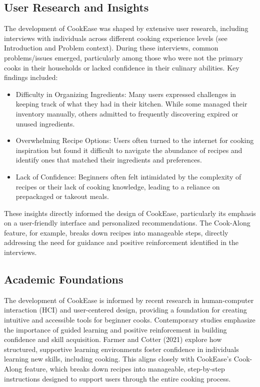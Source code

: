 \documentclass[10pt,twocolumn]{article}
\begin{document}
\subsection{User Research and Insights}
The development of CookEase was shaped by extensive user research, including interviews with individuals across different cooking experience levels (see Introduction and Problem context). During these interviews, common problems/issues emerged, particularly among those who were not the primary cooks in their households or lacked confidence in their culinary abilities. Key findings included:
\begin{itemize}
    \item Difficulty in Organizing Ingredients: Many users expressed challenges in keeping track of what they had in their kitchen. While some managed their inventory manually, others admitted to frequently discovering expired or unused ingredients.
    \item Overwhelming Recipe Options: Users often turned to the internet for cooking inspiration but found it difficult to navigate the abundance of recipes and identify ones that matched their ingredients and preferences.
    \item Lack of Confidence: Beginners often felt intimidated by the complexity of recipes or their lack of cooking knowledge, leading to a reliance on prepackaged or takeout meals.
\end{itemize}
These insights directly informed the design of CookEase, particularly its emphasis on a user-friendly interface and personalized recommendations. The Cook-Along feature, for example, breaks down recipes into manageable steps, directly addressing the need for guidance and positive reinforcement identified in the interviews.

\subsection{Academic Foundations}
The development of CookEase is informed by recent research in human-computer interaction (HCI) and user-centered design, providing a foundation for creating intuitive and accessible tools for beginner cooks. Contemporary studies emphasize the importance of guided learning and positive reinforcement in building confidence and skill acquisition. Farmer and Cotter (2021) explore how structured, supportive learning environments foster confidence in individuals learning new skills, including cooking. This aligns closely with CookEase’s Cook-Along feature, which breaks down recipes into manageable, step-by-step instructions designed to support users through the entire cooking process.
\end{document}
